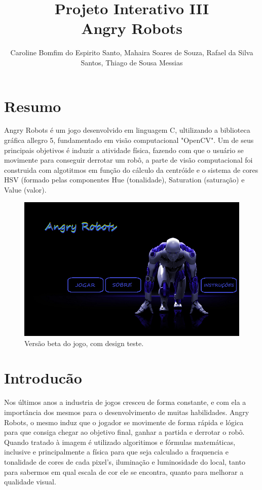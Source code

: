 \documentclass{sciposter}
\title{Projeto Interativo III\\ Angry Robots}
\author{Caroline Bomfim do Espirito Santo, Mahaira Soares de Souza, Rafael da Silva Santos, Thiago de Sousa Messias}
\institute 
{Bacharelado em Ciência da Computação\\
Centro Universitário SENAC - Campus Santo Amaro
(SENAC-SP)\\
Av. Engenheiro Eusébio Stevaux, 823 -- Santo Amaro, São Paulo -- CEP 04696-000 -- SP -- Brasil}
\begin{document}

\maketitle

\begin{multicols}{3}
\section {Resumo}

Angry Robots é um jogo desenvolvido em linguagem C, ultilizando a biblioteca gráfica allegro 5, fundamentado em visão computacional "OpenCV". Um de seus principais objetivos é induzir a atividade física, fazendo com que o usuário se movimente para conseguir derrotar um robô, a parte de visão computacional foi construida com algotitmos em função do cálculo da centróide e o sistema de cores HSV (formado pelas componentes Hue (tonalidade), Saturation (saturação) e Value (valor).

\begin{figure}[!htb]
\centering
\includegraphics[scale=0.8]{menu.png}
\caption{Versão beta do jogo, com design teste.}
\end{figure}


\section{Introducão}
Nos últimos anos a industria de jogos cresceu de forma constante, e com ela a importância dos mesmos para o desenvolvimento de muitas habilidades. 
Angry Robots, o mesmo induz que o jogador se movimente de forma rápida e lógica para que consiga chegar ao objetivo final, ganhar a partida e derrotar o robô.
Quando tratado à imagem é utilizado algoritimos e fórmulas matemáticas, inclusive e principalmente a física para que seja calculado a fraquencia e tonalidade de cores de cada pixel's, iluminação e luminosidade do local, tanto para sabermos em qual escala de cor ele se encontra, quanto para melhorar a qualidade visual.


\end{multicols}
\end{document}
